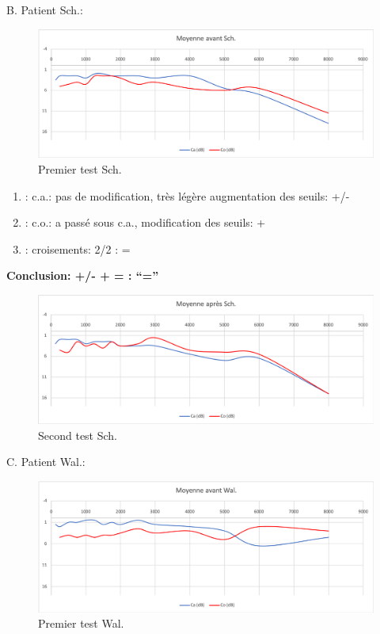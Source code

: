 B. Patient Sch.:

\begin{figure}
\centering
\includegraphics[width=0.7\linewidth]{images/graphiques/schaff_pre.png}
\caption[Moyenne OG+OD]{Premier test Sch.}
       
\label{groupecontroleimage1}
\end{figure}

	\begin{enumerate}
 		
 		\item : c.a.: pas de modification, très légère augmentation des
                  seuils: +/-
 		\item : c.o.: a passé sous c.a., modification des seuils: +
 		\item : croisements: 2/2 :     =
                  
                \end{enumerate}

              \textbf{  Conclusion:  +/-    +    =        : ``=''}

              \begin{figure}
\centering
\includegraphics[width=0.7\linewidth]{images/graphiques/schaff_post.png}
\caption[Moyenne OG+OD]{Second test Sch.}
       
\label{groupecontroleimage1}
\end{figure}


C. Patient Wal.:

\begin{figure}
\centering
\includegraphics[width=0.7\linewidth]{images/graphiques/wal_pre.png}
\caption[Moyenne OG+OD]{Premier test Wal.}
       
\label{groupecontroleimage1}
\end{figure}

